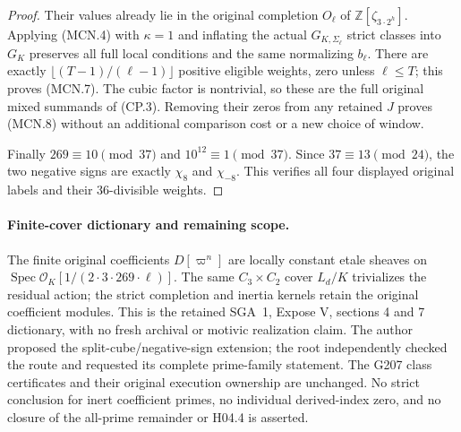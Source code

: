 \begin{proof}
Their values already lie in the original completion
$O_\ell$ of $\mathbb Z[\zeta_{3\cdot2^h}]$.
Applying (MCN.4) with $\kappa=1$ and inflating the actual
$G_{K,\Sigma_\ell}$ strict classes into $G_K$ preserves
all full local conditions and the same normalizing $b_\ell$.
There are exactly $\lfloor(T-1)/(\ell-1)\rfloor$ positive
eligible weights, zero unless $\ell\leq T$; this proves
(MCN.7).  The cubic factor is nontrivial, so these are
the full original mixed summands of (CP.3).  Removing
their zeros from any retained $J$ proves (MCN.8) without
an additional comparison cost or a new choice of window.

Finally $269\equiv10\pmod{37}$ and $10^{12}\equiv1\pmod{37}$.
Since $37\equiv13\pmod{24}$, the two negative signs are
exactly $\chi_8$ and $\chi_{-8}$.  This verifies all four
displayed original labels and their $36$-divisible weights.
\end{proof}

\paragraph{Finite-cover dictionary and remaining scope.}
The finite original coefficients $D[\varpi^n]$ are locally
constant etale sheaves on
$\operatorname{Spec}\mathcal O_K[1/(2\cdot3\cdot269\cdot\ell)]$.
The same $C_3\times C_2$ cover $L_d/K$ trivializes the
residual action; the strict completion and inertia kernels
retain the original coefficient modules.  This is the
retained SGA~1, Expose V, sections 4 and 7 dictionary,
with no fresh archival or motivic realization claim.
The author proposed the split-cube/negative-sign extension;
the root independently checked the route and requested
its complete prime-family statement.  The G207 class
certificates and their original execution ownership are
unchanged.  No strict conclusion for inert coefficient
primes, no individual derived-index zero, and no closure
of the all-prime remainder or H04.4 is asserted.
